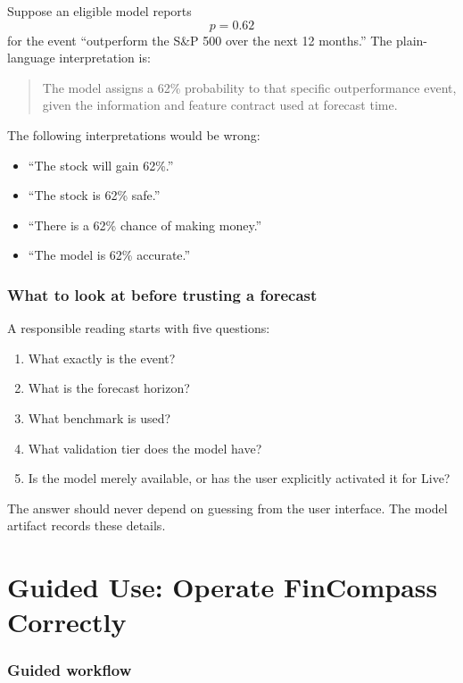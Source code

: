 \documentclass[11pt]{article}
\begin{document}
Suppose an eligible model reports
\begin{equation}
p=0.62
\end{equation}
for the event ``outperform the S\&P 500 over the next 12 months.'' The plain-language interpretation is:

\begin{quote}
The model assigns a 62\% probability to that specific outperformance event, given the information and feature contract used at forecast time.
\end{quote}

The following interpretations would be wrong:

\begin{itemize}
\item ``The stock will gain 62\%.''
\item ``The stock is 62\% safe.''
\item ``There is a 62\% chance of making money.''
\item ``The model is 62\% accurate.''
\end{itemize}

\section{What to look at before trusting a forecast}

A responsible reading starts with five questions:

\begin{enumerate}
\item What exactly is the event?
\item What is the forecast horizon?
\item What benchmark is used?
\item What validation tier does the model have?
\item Is the model merely available, or has the user explicitly activated it for Live?
\end{enumerate}

The answer should never depend on guessing from the user interface. The model artifact records these details.

\part{Guided Use: Operate FinCompass Correctly}

\section{Guided workflow}
\end{document}

